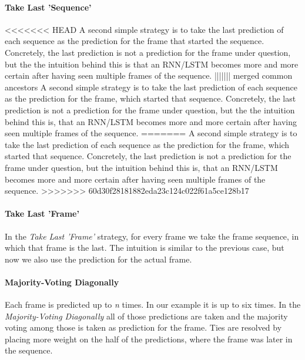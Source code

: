\paragraph{Take Last 'Sequence'}
<<<<<<< HEAD
A second simple strategy is to take the last prediction of each sequence as the prediction for the frame that started the sequence.
Concretely, the last prediction is not a prediction for the frame under question, but the the intuition behind this is that an RNN/LSTM becomes more and more certain after having seen multiple frames of the sequence.
||||||| merged common ancestors
A second simple strategy is to take the last prediction of each sequence as the prediction for the frame, which started that sequence.
Concretely, the last prediction is not a prediction for the frame under question, but the the intuition behind this is, that an RNN/LSTM becomes more and more certain after having seen multiple frames of the sequence.
=======
A second simple strategy is to take the last prediction of each sequence as the prediction for the frame, which started that sequence.
Concretely, the last prediction is not a prediction for the frame under question, but the intuition behind this is, that an RNN/LSTM becomes more and more certain after having seen multiple frames of the sequence.
>>>>>>> 60d30f28181882eda23c124c022f61a5ce128b17

\paragraph{Take Last 'Frame'}
In the \textit{Take Last 'Frame'} strategy, for every frame we take the frame sequence, in which that frame is the last.
The intuition is similar to the previous case, but now we also use the prediction for the actual frame.

\paragraph{Majority-Voting Diagonally}
Each frame is predicted up to \textit{n} times.
In our example it is up to six times.
In the \textit{Majority-Voting Diagonally} all of those predictions are taken and the majority voting among those is taken as prediction for the frame.
Ties are resolved by placing more weight on the half of the predictions, where the frame was later in the sequence.

